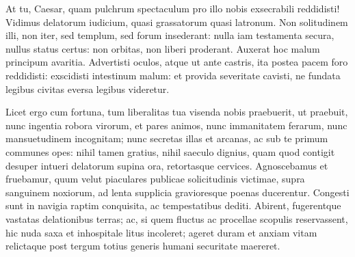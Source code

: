 At tu, Caesar, quam pulchrum spectaculum pro illo nobis exsecrabili reddidisti! Vidimus delatorum iudicium, quasi grassatorum quasi latronum. Non solitudinem illi, non iter, sed templum, sed forum insederant: nulla iam testamenta secura, nullus status certus: non orbitas, non liberi proderant. Auxerat hoc malum principum avaritia. Advertisti oculos, atque ut ante castris, ita postea pacem foro reddidisti: exscidisti intestinum malum: et provida severitate cavisti, ne fundata legibus civitas eversa legibus videretur. 

Licet ergo cum fortuna, tum liberalitas tua visenda nobis praebuerit, ut praebuit, nunc ingentia robora virorum, et pares animos, nunc immanitatem ferarum, nunc mansuetudinem incognitam; nunc secretas illas et arcanas, ac sub te primum communes opes: nihil tamen gratius, nihil saeculo dignius, quam quod contigit desuper intueri delatorum supina ora, retortasque cervices. Agnoscebamus et fruebamur, quum velut piaculares publicae solicitudinis victimae, supra sanguinem noxiorum, ad lenta supplicia gravioresque poenas ducerentur. Congesti sunt in navigia raptim conquisita, ac tempestatibus dediti. Abirent, fugerentque vastatas delationibus terras; ac, si quem fluctus ac procellae scopulis reservassent, hic nuda saxa et inhospitale litus incoleret; ageret duram et anxiam vitam relictaque post tergum totius generis humani securitate maereret.

